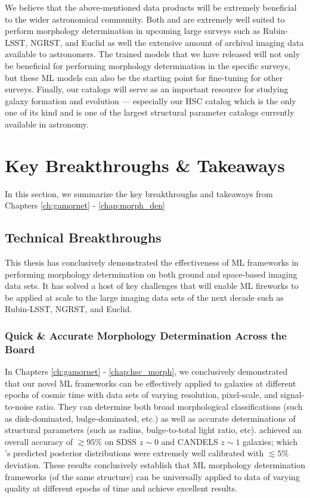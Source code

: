 We believe that the above-mentioned data products will be extremely beneficial to the wider astronomical community. Both \gamornet{} and \gampen{} are extremely well suited to perform morphology determination in upcoming large surveys such as Rubin-LSST, NGRST, and Euclid as well the extensive amount of archival imaging data available to astronomers. The trained models that we have released will not only be beneficial for performing morphology determination in the specific surveys, but these ML models can also be the starting point for fine-tuning for other surveys. Finally, our catalogs will serve as an important resource for studying galaxy formation and evolution --- especially our HSC  catalog which is the only one of its kind and is one of the largest structural parameter catalogs currently available in astronomy. 

\section{Key Breakthroughs \& Takeaways} \label{sec_conc:takeaways}

In this section, we summarize the key breakthroughs and takeaways from Chapters \ref{ch:gamornet} - \ref{chap:morph_den}

\subsection{Technical Breakthroughs} \label{sec_conc:tech_breakthroughts}
This thesis has conclusively demonstrated the effectiveness of ML frameworks in performing morphology determination on both ground and space-based imaging data sets. It has solved a host of key challenges that will enable ML fireworks to be applied at scale to the large imaging data sets of the next decade such as Rubin-LSST, NGRST, and Euclid. 

\subsubsection{Quick \& Accurate Morphology Determination Across the Board } 
In Chapters \ref{ch:gamornet} - \ref{chap:hsc_morph}, we conclusively demonstrated that our novel ML frameworks can be effectively applied to galaxies at different epochs of cosmic time with data sets of varying resolution, pixel-scale, and signal-to-noise ratio. They can determine both broad morphological classifications (such as disk-dominated, bulge-dominated, etc.) as well as accurate determinations of structural parameters (such as radius, bulge-to-total light ratio, etc). \gamornet{} achieved an overall accuracy  of $\gtrsim 95\%$ on SDSS $z\sim0$ and CANDELS $z\sim1$ galaxies; which \gampen{}'s predicted posterior distributions were extremely well calibrated with $\lesssim 5\%$ deviation. These results conclusively establish that ML morphology determination frameworks (of the same structure) can be universally applied to data of varying quality at different epochs of time and achieve excellent results.

